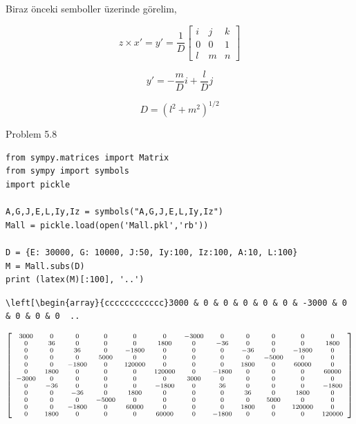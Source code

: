 \documentclass[12pt,fleqn]{article}\usepackage{../../common}
\begin{document}
Biraz önceki semboller üzerinde görelim,

$$
z \times x' = y' = \frac{1}{D}
\left[\begin{array}{ccc}
i & j & k \\ 0 & 0 & 1 \\ l & m & n
\end{array}\right]
$$

$$
y' = - \frac{m}{D} i + \frac{l}{D} j
$$

$$
D = (l^2 + m^2)^{1/2}
$$





















Problem 5.8

\begin{verbatim}
from sympy.matrices import Matrix
from sympy import symbols
import pickle

A,G,J,E,L,Iy,Iz = symbols("A,G,J,E,L,Iy,Iz")
Mall = pickle.load(open('Mall.pkl','rb'))

D = {E: 30000, G: 10000, J:50, Iy:100, Iz:100, A:10, L:100}
M = Mall.subs(D)
print (latex(M)[:100], '..')
\end{verbatim}

\begin{verbatim}
\left[\begin{array}{cccccccccccc}3000 & 0 & 0 & 0 & 0 & 0 & -3000 & 0 & 0 & 0 & 0  ..
\end{verbatim}

$$
{\scriptsize
\left[\begin{array}{cccccccccccc}3000 & 0 & 0 & 0 & 0 & 0 & -3000 & 0 & 0 & 0 & 0 & 0\\0 & 36 & 0 & 0 & 0 & 1800 & 0 & -36 & 0 & 0 & 0 & 1800\\0 & 0 & 36 & 0 & -1800 & 0 & 0 & 0 & -36 & 0 & -1800 & 0\\0 & 0 & 0 & 5000 & 0 & 0 & 0 & 0 & 0 & -5000 & 0 & 0\\0 & 0 & -1800 & 0 & 120000 & 0 & 0 & 0 & 1800 & 0 & 60000 & 0\\0 & 1800 & 0 & 0 & 0 & 120000 & 0 & -1800 & 0 & 0 & 0 & 60000\\-3000 & 0 & 0 & 0 & 0 & 0 & 3000 & 0 & 0 & 0 & 0 & 0\\0 & -36 & 0 & 0 & 0 & -1800 & 0 & 36 & 0 & 0 & 0 & -1800\\0 & 0 & -36 & 0 & 1800 & 0 & 0 & 0 & 36 & 0 & 1800 & 0\\0 & 0 & 0 & -5000 & 0 & 0 & 0 & 0 & 0 & 5000 & 0 & 0\\0 & 0 & -1800 & 0 & 60000 & 0 & 0 & 0 & 1800 & 0 & 120000 & 0\\0 & 1800 & 0 & 0 & 0 & 60000 & 0 & -1800 & 0 & 0 & 0 & 120000\end{array}\right]
}
$$
\end{document}
